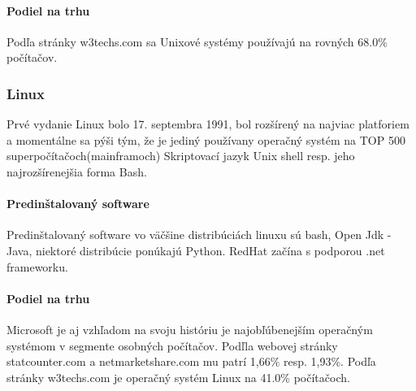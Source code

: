 \paragraph{Podiel na trhu}
\indent Podľa stránky w3techs.com\cite{pop} sa Unixové systémy používajú na rovných 68.0\% počítačov.
\subsubsection{Linux}
\indent  Prvé vydanie Linux  bolo 17. septembra 1991, bol rozšírený na najviac platforiem a momentálne sa pýši tým, že je jediný používany operačný systém na TOP 500 superpočítačoch(mainframoch) Skriptovací jazyk Unix shell resp. jeho najrozšírenejšia forma Bash.
\paragraph{Predinštalovaný software}
\indent Predinštalovaný software vo väčšine distribúciách linuxu sú bash, Open Jdk - Java, niektoré distribúcie ponúkajú Python. RedHat začína s podporou .net frameworku.
\paragraph{Podiel na trhu}
\indent Microsoft je aj vzhľadom na svoju históriu je najobľúbenejším operačným systémom v segmente osobných počítačov. Podľla webovej stránky statcounter.com\cite{statcounter} a netmarketshare.com\cite{netmarketshare} mu patrí 1,66\% resp.  1,93\%.
\indent Podľa stránky w3techs.com\cite{pop} je operačný systém Linux na 41.0\% počítačoch.
\newline
